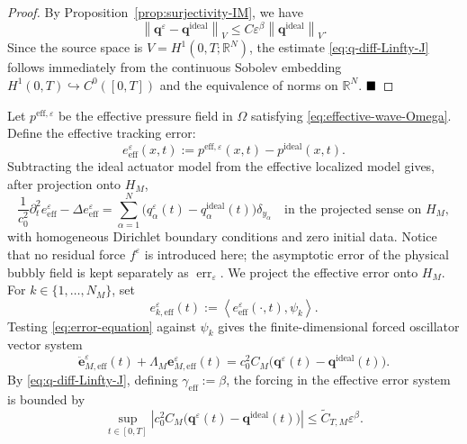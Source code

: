 \documentclass[11pt,a4paper]{article}
\numberwithin{equation}{section}
\newcommand{\veps}{\varepsilon}
\newcommand{\norm}[1]{\left\lVert #1 \right\rVert}
\newcommand{\abs}[1]{\left\lvert #1 \right\rvert}
\newcommand{\ip}[2]{\left\langle #1,#2 \right\rangle}
\begin{document}
\begin{proof}
By Proposition~\ref{prop:surjectivity-IM}, we have 
$$\norm{\mathbf{q}^\veps-\mathbf{q}^{\mathrm{ideal}}}_V \le C\veps^\beta\norm{\mathbf{q}^{\mathrm{ideal}}}_V.$$ 
Since the source space is $V=H^1(0,T;\mathbb{R}^N)$, the estimate \eqref{eq:q-diff-Linfty-J} follows immediately from the continuous Sobolev embedding $H^1(0,T) \hookrightarrow C^0([0,T])$ and the equivalence of norms on $\mathbb{R}^N$. $\hfill \blacksquare$
\end{proof}

\bigskip

\noindent
Let $p^{\mathrm{eff},\veps}$ be the effective pressure field in $\Omega$ satisfying \eqref{eq:effective-wave-Omega}. Define the effective tracking error:
\[
 e_{\mathrm{eff}}^\veps(x,t):=p^{\mathrm{eff},\veps}(x,t)-p^{\mathrm{ideal}}(x,t).
\]
Subtracting the ideal actuator model from the effective localized model gives, after projection onto $H_M$,
\begin{equation}
\label{eq:error-equation}
 \frac{1}{c_0^2}\partial_t^2 e_{\mathrm{eff}}^\veps - \Delta e_{\mathrm{eff}}^\veps
 =
 \sum_{\alpha=1}^N\bigl(q_\alpha^\veps(t)-q_\alpha^{\mathrm{ideal}}(t)\bigr)\delta_{y_\alpha}
 \quad\text{in the projected sense on }H_M,
\end{equation}
with homogeneous Dirichlet boundary conditions and zero initial data. Notice that no residual force $f^\veps$ is introduced here; the asymptotic error of the physical bubbly field is kept separately as $\operatorname{err}_{\veps}$.
\newline
We project the effective error onto $H_M$. For $k\in \{1, \dots, N_M\}$, set
\[
 e_{k,\mathrm{eff}}^\veps(t):=\ip{e_{\mathrm{eff}}^\veps(\cdot,t)}{\psi_k}.
\]
Testing \eqref{eq:error-equation} against $\psi_k$ gives the finite-dimensional forced oscillator vector system
\begin{equation}
\label{eq:band-error-vector}
 \ddot{\mathbf{e}}_{M,\mathrm{eff}}^\veps(t) + \Lambda_M \mathbf{e}_{M,\mathrm{eff}}^\veps(t)
 =
 c_0^2 C_M\bigl(\mathbf{q}^\veps(t)-\mathbf{q}^{\mathrm{ideal}}(t)\bigr).
\end{equation}
By \eqref{eq:q-diff-Linfty-J}, defining $\gamma_{\mathrm{eff}}:=\beta$, the forcing in the effective error system is bounded by
\begin{equation}
\label{eq:forcing-band}
 \sup_{t\in[0,T]}
 \abs{c_0^2 C_M\bigl(\mathbf{q}^\veps(t)-\mathbf{q}^{\mathrm{ideal}}(t)\bigr)}
 \le \widetilde{C}_{T,M}\veps^\beta.
\end{equation}
\end{document}
